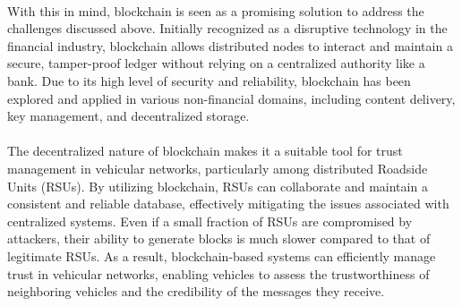 \documentclass[11pt]{IEEEphot}
\begin{document}
\\
With this in mind, blockchain is seen as a promising solution to address the challenges discussed above. Initially recognized as a disruptive technology in the financial industry, blockchain allows distributed nodes to interact and maintain a secure, tamper-proof ledger without relying on a centralized authority like a bank. Due to its high level of security and reliability, blockchain has been explored and applied in various non-financial domains, including content delivery, key management, and decentralized storage.
\\
\\
The decentralized nature of blockchain makes it a suitable tool for trust management in vehicular networks, particularly among distributed Roadside Units (RSUs). By utilizing blockchain, RSUs can collaborate and maintain a consistent and reliable database, effectively mitigating the issues associated with centralized systems. Even if a small fraction of RSUs are compromised by attackers, their ability to generate blocks is much slower compared to that of legitimate RSUs. As a result, blockchain-based systems can efficiently manage trust in vehicular networks, enabling vehicles to assess the trustworthiness of neighboring vehicles and the credibility of the messages they receive.
\end{document}
